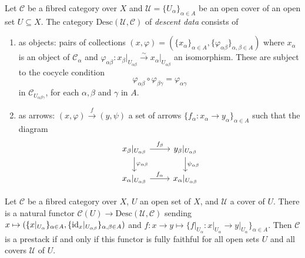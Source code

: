 \begin{definition}\label{def:descend-data}
	Let $\mathcal{C}$ be a fibred category over $X$ and $\mathscr{U} = \{U_{\alpha}\}_{\alpha\in A}$ be an open cover of an open set $U\subseteq X$. The category $\mathrm{Desc}(\mathscr{U}, \mathcal{C})$ of \emph{descent data} consists of
	\begin{enumerate}[label = (\roman*)]
		\item as objects: pairs of collections $(x,\varphi) = (\{x_{\alpha}\}_{\alpha\in A}, \{\varphi_{\alpha\beta}\}_{\alpha, \beta\in A})$ where $x_{\alpha}$ is an object of $\mathcal{C}_{\alpha}$ and $\varphi_{\alpha\beta}\colon x_{\beta}\lvert_{U_{\alpha\beta}} \xrightarrow{\sim} x_{\alpha}\lvert_{U_{\alpha\beta}}$ an isomorphism. These are subject to the cocycle condition
		\begin{equation}\label{eqn:cocycle-condition}
			\varphi_{\alpha\beta} \circ \varphi_{\beta\gamma} = \varphi_{\alpha\gamma}
		\end{equation}
		in $\mathcal{C}_{U_{\alpha\beta\gamma}}$, for each $\alpha, \beta$ and $\gamma$ in $A$.
		\item as arrows: $(x, \varphi) \xrightarrow{f} (y, \psi)$ a set of arrows $\{f_{\alpha}\colon x_{\alpha} \to y_{\alpha}\}_{\alpha\in A}$ such that the diagram
		\begin{equation}\label{eqn:compatibility-descent-data}
			\begin{tikzcd}
				x_{\beta}\lvert_{U_{\alpha\beta}} \ar[r, "f_{\beta}"] \ar[d, "\varphi_{\alpha \beta}"] & y_{\beta}\lvert_{U_{\alpha\beta}} \ar[d, "\psi_{\alpha \beta}"] \\
				x_{\alpha}\lvert_{U_{\alpha\beta}} \ar[r, "f_{\alpha}"] & x_{\alpha}\lvert_{U_{\alpha\beta}} 
			\end{tikzcd}
		\end{equation}
		
	\end{enumerate}
	
\end{definition}
\begin{remark}\label{rem:fibred-category-induces-descent}
	Let $\mathcal{C}$ be a fibred category over $X$, $U$ an open set of $X$, and $\mathscr{U}$ a cover of $U$. There is a natural functor $\mathcal{C}(U) \to \mathrm{Desc}(\mathscr{U}, \mathcal{C})$ sending $x \mapsto (\{x\lvert_{U_{\alpha}}\}_{\alpha\in A}, \{\operatorname{id}_{x}\lvert_{U_{\alpha\beta}}\}_{\alpha,\beta\in A})$ and $f\colon x \to y \mapsto \{f\lvert_{U_{\alpha}}\colon x\lvert_{U_{\alpha}} \to y\lvert_{U_{\alpha}}\}_{\alpha\in A}$. Then $\mathcal{C}$ is a prestack if and only if this functor is fully faithful for all open sets $U$ and all covers $\mathscr{U}$ of $U$.
\end{remark}
